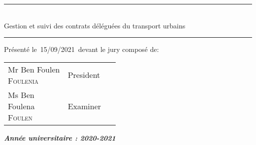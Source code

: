 \documentclass[a4paper, oneside, french, 12pt, final]{extreport}
\newcommand{\dateSoutenance} {%
  12/06/2018%
}
\newcommand{\studyDepartment} {%
  Entreprise d'accueil %
}
\newcommand{\juryPresident} {%
  Mr Ben Foulen \textsc{Foulenia}%
}
\newcommand{\juryPresidentDesc} {%
  President%
}
\newcommand{\juryMemberOne} {%
  Ms Ben Foulena \textsc{Foulen}%
}
\newcommand{\juryMemberOneDesc} {%
  Examiner %
}
\begin{document}
\begin{titlepage}
\begin{center}
    \vspace{10pt} {%
      \renewcommand*{\familydefault}{\defaultFont}
      \fontsize{27pt}{27pt}\selectfont%
      \rule{0.5\textwidth}{.4pt}\\
      \vspace{10pt}
      Gestion et suivi des contrats déléguées du transport urbains\\%
      \vspace{10pt}
      \rule{0.5\textwidth}{.4pt}
    }

    \vspace{10pt}
    Présenté le~15/09/2021~devant le jury composé de:\\
    \vspace{20pt}
    \begin{tabular}{p{0.3\linewidth} p{0.15\linewidth}}
      \juryPresident{} & \juryPresidentDesc{} \\
      \juryMemberOne{} & \juryMemberOneDesc{} \\
    \end{tabular}

    \vspace{10pt}%
    \textbf{\textit{Année universitaire : 2020-2021}}\\


  \end{center}
\end{titlepage}




%
\end{document}
